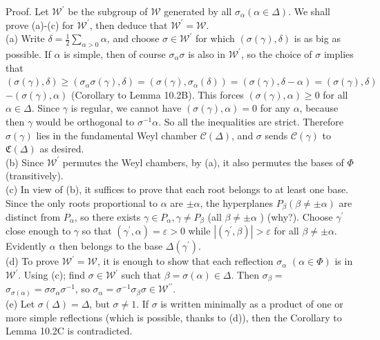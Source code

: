 \documentclass[10pt]{article}
\begin{document}
Proof. Let $\mathscr{W}^{\prime}$ be the subgroup of $\mathscr{W}$ generated by all $\sigma_{\alpha}(\alpha \in \Delta)$. We shall prove (a)-(c) for $\mathscr{W}^{\prime}$, then deduce that $\mathscr{W}^{\prime}=\mathscr{W}$.\\
(a) Write $\delta=\frac{1}{2} \sum_{\alpha>0} \alpha$, and choose $\sigma \in \mathscr{W}^{\prime}$ for which $(\sigma(\gamma), \delta)$ is as big as possible. If $\alpha$ is simple, then of course $\sigma_{\alpha} \sigma$ is also in $\mathscr{W}^{\prime}$, so the choice of $\sigma$ implies that $(\sigma(\gamma), \delta) \geq\left(\sigma_{\alpha} \sigma(\gamma), \delta\right)=\left(\sigma(\gamma), \sigma_{\alpha}(\delta)\right)=(\sigma(\gamma), \delta-\alpha)=(\sigma(\gamma), \delta)$ $-(\sigma(\gamma), \alpha)$ (Corollary to Lemma 10.2B). This forces $(\sigma(\gamma), \alpha) \geq 0$ for all $\alpha \in \Delta$. Since $\gamma$ is regular, we cannot have $(\sigma(\gamma), \alpha)=0$ for any $\alpha$, because then $\gamma$ would be orthogonal to $\sigma^{-1} \alpha$. So all the inequalities are strict. Therefore $\sigma(\gamma)$ lies in the fundamental Weyl chamber $\mathcal{C}(\Delta)$, and $\sigma$ sends $\mathcal{C}(\gamma)$ to $\mathfrak{C}(\Delta)$ as desired.\\
(b) Since $\mathscr{W}^{\prime}$ permutes the Weyl chambers, by (a), it also permutes the bases of $\Phi$ (transitively).\\
(c) In view of (b), it suffices to prove that each root belongs to at least one base. Since the only roots proportional to $\alpha$ are $\pm \alpha$, the hyperplanes $P_{\beta}(\beta \neq \pm \alpha)$ are distinct from $P_{\alpha}$, so there exists $\gamma \in P_{\alpha}, \gamma \neq P_{\beta}$ (all $\beta \neq \pm \alpha$ ) (why?). Choose $\gamma^{\prime}$ close enough to $\gamma$ so that $\left(\gamma^{\prime}, \alpha\right)=\varepsilon>0$ while $\left|\left(\gamma^{\prime}, \beta\right)\right|>\varepsilon$ for all $\beta \neq \pm \alpha$. Evidently $\alpha$ then belongs to the base $\Delta\left(\gamma^{\prime}\right)$.\\
(d) To prove $\mathscr{W}^{\prime}=\mathscr{W}$, it is enough to show that each reflection $\sigma_{\alpha}$ $(\alpha \in \Phi)$ is in $\mathscr{W}^{\prime}$. Using (c); find $\sigma \in \mathscr{W}^{\prime}$ such that $\beta=\sigma(\alpha) \in \Delta$. Then $\sigma_{\beta}=$ $\sigma_{\sigma(\alpha)}=\sigma \sigma_{\alpha} \sigma^{-1}$, so $\sigma_{\alpha}=\sigma^{-1} \sigma_{\beta} \sigma \in \mathscr{W}^{\prime \prime}$.\\
(e) Let $\sigma(\Delta)=\Delta$, but $\sigma \neq 1$. If $\sigma$ is written minimally as a product of one or more simple reflections (which is possible, thanks to (d)), then the Corollary to Lemma 10.2C is contradicted.
\end{document}

